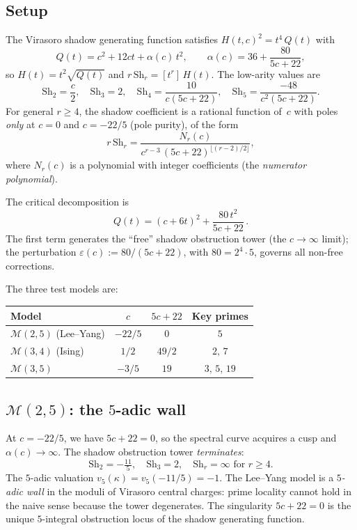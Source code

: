 \documentclass[11pt]{article}
\newcommand{\cM}{\mathcal{M}}
\begin{document}
\subsection*{Setup}

The Virasoro shadow generating function satisfies
$H(t,c)^2 = t^4\,Q(t)$ with
\[
Q(t) = c^2 + 12ct + \alpha(c)\,t^2,
\qquad
\alpha(c) = 36 + \frac{80}{5c+22},
\]
so $H(t) = t^2\sqrt{Q(t)}$ and
$r\,\mathrm{Sh}_r = [t^r]\,H(t)$.  The low-arity values are
\[
\mathrm{Sh}_2 = \frac{c}{2},
\quad
\mathrm{Sh}_3 = 2,
\quad
\mathrm{Sh}_4 = \frac{10}{c(5c{+}22)},
\quad
\mathrm{Sh}_5 = \frac{-48}{c^2(5c{+}22)}.
\]
For general $r \ge 4$, the shadow coefficient is a rational
function of~$c$ with poles \emph{only} at $c = 0$ and
$c = -22/5$ (pole purity), of the form
\[
r\,\mathrm{Sh}_r
= \frac{N_r(c)}{c^{r-3}\,(5c{+}22)^{\lfloor(r{-}2)/2\rfloor}},
\]
where $N_r(c)$ is a polynomial with integer coefficients
(the \emph{numerator polynomial}).

The critical decomposition is
\[
Q(t) = (c + 6t)^2 + \frac{80\,t^2}{5c + 22}\,.
\]
The first term generates the ``free'' shadow obstruction tower
(the $c \to \infty$ limit); the perturbation
$\varepsilon(c) := 80/(5c + 22)$, with
$80 = 2^4 \cdot 5$, governs all non-free corrections.

\smallskip

The three test models are:
\begin{center}
\renewcommand{\arraystretch}{1.3}
\begin{tabular}{lccc}
\hline
Model & $c$ & $5c+22$ & Key primes \\
\hline
$\cM(2,5)$ (Lee--Yang) & $-22/5$ & $0$ & $5$ \\
$\cM(3,4)$ (Ising) & $1/2$ & $49/2$ & $2,\,7$ \\
$\cM(3,5)$ & $-3/5$ & $19$ & $3,\,5,\,19$ \\
\hline
\end{tabular}
\end{center}

\subsection*{$\cM(2,5)$: the $5$-adic wall}

At $c = -22/5$, we have $5c + 22 = 0$, so the spectral curve
acquires a cusp and $\alpha(c) \to \infty$.  The shadow obstruction tower
\emph{terminates}:
\[
\mathrm{Sh}_2 = -\tfrac{11}{5}, \quad
\mathrm{Sh}_3 = 2, \quad
\mathrm{Sh}_r = \infty \text{ for } r \ge 4.
\]
The $5$-adic valuation $v_5(\kappa) = v_5(-11/5) = -1$.  The
Lee--Yang model is a \emph{$5$-adic wall} in the moduli of
Virasoro central charges: prime locality cannot hold in the
naive sense because the tower degenerates.  The singularity
$5c + 22 = 0$ is the unique $5$-integral obstruction locus of
the shadow generating function.
\end{document}
